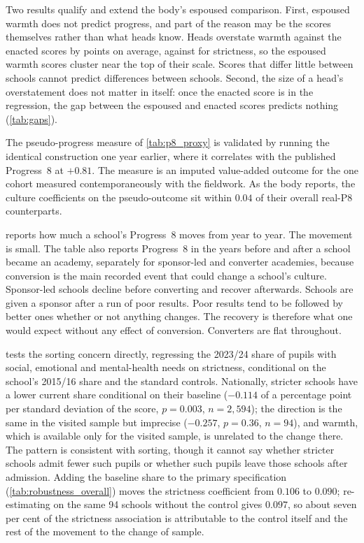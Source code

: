 Two results qualify and extend the body's espoused comparison. First, espoused warmth does not predict progress, and part of the reason may be the scores themselves rather than what heads know. Heads overstate warmth against the enacted scores by \GapWarmth{} points on average, against \GapStrictness{} for strictness, so the espoused warmth scores cluster near the top of their scale. Scores that differ little between schools cannot predict differences between schools. Second, the size of a head's overstatement does not matter in itself: once the enacted score is in the regression, the gap between the espoused and enacted scores predicts nothing (\cref{tab:gaps}).




The pseudo-progress measure of \cref{tab:p8_proxy} is validated by running
the identical construction one year earlier, where it correlates with the
published Progress~8 at $+0.81$. The measure is an imputed value-added
outcome for the one cohort measured contemporaneously with the fieldwork.
As the body reports, the culture coefficients on the pseudo-outcome sit
within $0.04$ of their overall real-P8 counterparts.

 reports how much a school's Progress~8 moves from year to year. The movement is small. The table also reports Progress~8 in the years before and after a school became an academy, separately for sponsor-led and converter academies, because conversion is the main recorded event that could change a school's culture. Sponsor-led schools decline before
converting and recover afterwards. Schools are given a sponsor after a run of poor results. Poor results tend to be followed by better ones whether or not anything changes. The recovery is therefore what one would expect without any effect of conversion. Converters are flat throughout.




 tests the sorting concern directly, regressing the
2023/24 share of pupils with social, emotional and mental-health needs on
strictness, conditional on the school's 2015/16 share and the standard
controls. Nationally, stricter schools have a lower current share conditional
on their baseline ($-0.114$ of a percentage point per standard deviation of
the score, $p = 0.003$, $n = 2{,}594$); the direction is the same in the visited
sample but imprecise ($-0.257$, $p = 0.36$, $n = 94$), and warmth, which is
available only for the visited sample, is unrelated to the change there. The pattern is consistent
with sorting, though it cannot say whether stricter schools admit fewer such pupils or whether such pupils leave those schools after admission. Adding the baseline share to the
primary specification (\cref{tab:robustness_overall}) moves the
strictness coefficient from $0.106$ to $0.090$; re-estimating on the same 94
schools without the control gives $0.097$, so about seven per cent of the
strictness association is attributable to the control itself and the rest of
the movement to the change of sample.

